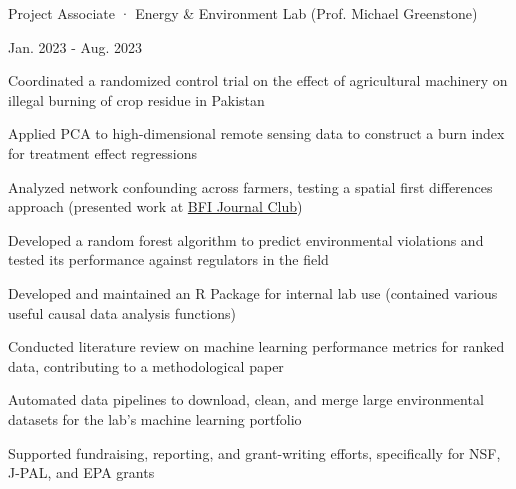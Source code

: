     \begin{minipage}{.75\linewidth} \begin{flushleft}
    		Project Associate · Energy \& Environment Lab (Prof. Michael Greenstone)
    	\end{flushleft} \end{minipage}
    \hfill 
    \begin{minipage}{.20\linewidth}\begin{flushright}
    	 Jan. 2023 - Aug. 2023
    	\end{flushright}\end{minipage}
        \vspace{-5pt}
	\begin{description}[font=$\bullet$]
        \item{Coordinated a randomized control trial on the effect of agricultural machinery on illegal burning of crop residue in Pakistan}
        \vspace{-6pt}
        \item{Applied PCA to high-dimensional remote sensing data to construct a burn index for treatment effect regressions}
        \vspace{-6pt}
        \item{Analyzed network confounding across farmers, testing a spatial first differences approach (presented work at \href{https://github.com/posmikdc/posmikdc.github.io/blob/master/pdf/RP_Journal_Club__Druckenmiller___Hsiang__2019.pdf}{BFI Journal Club})}
        \vspace{-6pt}
        \item{Developed a random forest algorithm to predict environmental violations and tested its performance against regulators in the field}
        \vspace{-6pt}
        \item{Developed and maintained an R Package for internal lab use (contained various useful causal data analysis functions)}
        \vspace{-6pt} 
        \item{Conducted literature review on machine learning performance metrics for ranked data, contributing to a methodological paper}
        \vspace{-6pt}
        \item{Automated data pipelines to download, clean, and merge large environmental datasets for the lab's machine learning portfolio}
        \vspace{-6pt}
        \item{Supported fundraising, reporting, and grant-writing efforts, specifically for NSF, J-PAL, and EPA grants}
\end{description}

